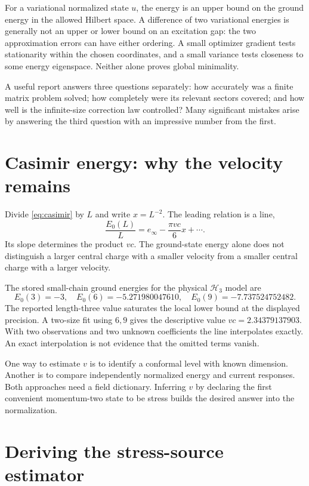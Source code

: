 For a variational normalized state $u$, the energy is an upper bound on the
ground energy in the allowed Hilbert space. A difference of two variational
energies is generally not an upper or lower bound on an excitation gap:
the two approximation errors can have either ordering. A small optimizer
gradient tests stationarity within the chosen coordinates, and a small
variance tests closeness to some energy eigenspace. Neither alone proves
global minimality.

\begin{remark}
A useful report answers three questions separately: how accurately was a
finite matrix problem solved; how completely were its relevant sectors
covered; and how well is the infinite-size correction law controlled?
Many significant mistakes arise by answering the third question with an
impressive number from the first.
\end{remark}

\section{Casimir energy: why the velocity remains}

Divide \eqref{eq:casimir} by $L$ and write $x=L^{-2}$. The leading relation
is a line,
\[
 \frac{E_0(L)}L=e_\infty-\frac{\pi vc}{6}x+\cdots.
\]
Its slope determines the product $vc$. The ground-state energy alone does
not distinguish a larger central charge with a smaller velocity from a
smaller central charge with a larger velocity.

The stored small-chain ground energies for the physical $\mathcal H_3$ model are
\[
 E_0(3)=-3,\quad E_0(6)=-5.271980047610,\quad
 E_0(9)=-7.737524752482.
\]
The reported length-three value saturates the local lower bound at
the displayed precision. A two-size fit using $6,9$ gives the descriptive value
$vc=2.34379137903$. With two observations and two unknown coefficients
the line interpolates exactly. An exact interpolation is not evidence
that the omitted terms vanish.

One way to estimate $v$ is to identify a conformal level with known
dimension. Another is to compare independently normalized energy and
current responses. Both approaches need a field dictionary. Inferring
$v$ by declaring the first convenient momentum-two state to be stress
builds the desired answer into the normalization.

\section{Deriving the stress-source estimator}

